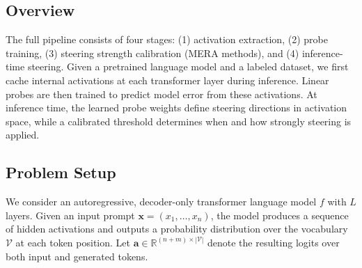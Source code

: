 \documentclass[sigconf]{acmart}
\begin{document}
\subsection{Overview}

The full pipeline consists of four stages: (1) activation extraction, (2) probe training, (3) steering strength calibration (MERA methods), and (4) inference-time steering. Given a pretrained language model and a labeled dataset, we first cache internal activations at each transformer layer during inference. Linear probes are then trained to predict model error from these activations. At inference time, the learned probe weights define steering directions in activation space, while a calibrated threshold determines when and how strongly steering is applied.





\subsection{Problem Setup}

We consider an autoregressive, decoder-only transformer language model $f$ with $L$ layers. Given an input prompt $\mathbf{x} = (x_1, \dots, x_n)$, the model produces a sequence of hidden activations and outputs a probability distribution over the vocabulary $\mathcal{V}$ at each token position. Let $\mathbf{a} \in \mathbb{R}^{(n+m)\times|\mathcal{V}|}$ denote the resulting logits over both input and generated tokens.
\end{document}
